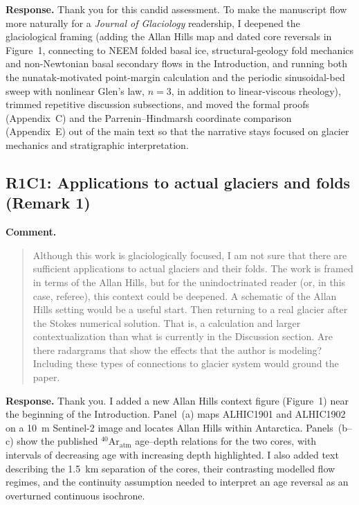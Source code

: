 \documentclass[11pt]{article}
\newcommand{\response}[1]{\noindent\textcolor{responseblue}{#1}}
\begin{document}
\response{\textbf{Response.} Thank you for this candid assessment. To make the manuscript flow more naturally for a \emph{Journal of Glaciology} readership, I deepened the glaciological framing (adding the Allan Hills map and dated core reversals in Figure~1, connecting to NEEM folded basal ice, structural-geology fold mechanics and non-Newtonian basal secondary flows in the Introduction, and running both the nunatak-motivated point-margin calculation and the periodic sinusoidal-bed sweep with nonlinear Glen's law, \(n=3\), in addition to linear-viscous rheology), trimmed repetitive discussion subsections, and moved the formal proofs (Appendix~C) and the Parrenin--Hindmarsh coordinate comparison (Appendix~E) out of the main text so that the narrative stays focused on glacier mechanics and stratigraphic interpretation.}

\subsection*{R1C1: Applications to actual glaciers and folds (Remark 1)}

\noindent\textbf{Comment.}
\begin{quote}
Although this work is glaciologically focused, I am not sure that there are sufficient applications to actual glaciers and their folds. The work is framed in terms of the Allan Hills, but for the unindoctrinated reader (or, in this case, referee), this context could be deepened. A schematic of the Allan Hills setting would be a useful start. Then returning to a real glacier after the Stokes numerical solution. That is, a calculation and larger contextualization than what is currently in the Discussion section. Are there radargrams that show the effects that the author is modeling? Including these types of connections to glacier system would ground the paper.
\end{quote}

\response{\textbf{Response.} Thank you. I added a new Allan Hills context figure (Figure~1) near the beginning of the Introduction. Panel~(a) maps ALHIC1901 and ALHIC1902 on a 10~m Sentinel-2 image and locates Allan Hills within Antarctica. Panels~(b--c) show the published \(^{40}\mathrm{Ar}_{\mathrm{atm}}\) age--depth relations for the two cores, with intervals of decreasing age with increasing depth highlighted. I also added text describing the 1.5~km separation of the cores, their contrasting modelled flow regimes, and the continuity assumption needed to interpret an age reversal as an overturned continuous isochrone.}
\end{document}
